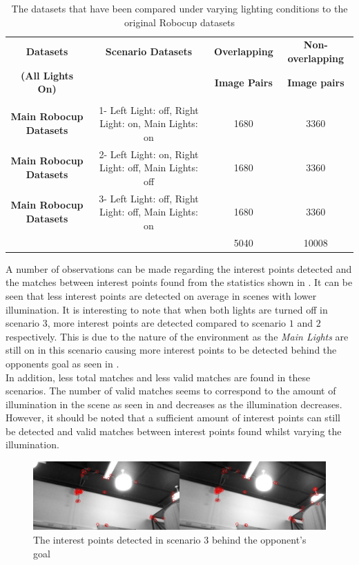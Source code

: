 \documentclass[11pt]{report}
\begin{document}
\begin{table}
\centering
\caption{The datasets that have been compared under varying lighting conditions
to the original Robocup datasets}
\footnotesize
\begin{tabular}{|c|c|c|c|}
\hline 
\textbf{Datasets} & \textbf{Scenario Datasets} & \textbf{Overlapping } & \textbf{Non-overlapping }\tabularnewline
\textbf{(All Lights On)} &  & \textbf{Image Pairs} & \textbf{Image pairs}\tabularnewline
\hline 
\hline 
 &  &  & \tabularnewline
\hline 
\textbf{Main Robocup Datasets} & 1- Left Light: off, Right Light: on, Main Lights: on & 1680 & 3360\tabularnewline
\hline 
\textbf{Main Robocup Datasets} & 2- Left Light: on, Right Light: off, Main Lights: off & 1680 & 3360\tabularnewline
\hline 
\textbf{Main Robocup Datasets} & 3- Left Light: off, Right Light: off, Main Lights: on & 1680 & 3360\tabularnewline
\hline 
 &  & 5040 & 10008\tabularnewline
\hline 
\end{tabular}
\label{tab:datasetLighting}
\end{table}

A number of observations can be made regarding the interest points detected and the matches between interest points found from the statistics shown in . It can be seen that less interest points are detected on average in scenes with lower illumination. It is interesting to note that when both lights are turned off in scenario $3$, more interest points are detected compared to scenario $1$ and $2$ respectively. This is due to the nature of the environment as the \textit{Main Lights} are still on in this scenario causing more interest points to be detected behind the opponents goal as seen in . \\

In addition, less total matches and less valid matches are found in these scenarios. The number of valid matches seems to correspond to the amount of illumination in the scene as seen in  and decreases as the illumination decreases. However, it should be noted that a sufficient amount of interest points can still be detected and valid matches between interest points found whilst varying the illumination.\\

\begin{figure}[h!] 
  \centering
    \includegraphics[width=1.0\textwidth]{../Drawings/Matching/dataset_lighting_incorrect_matches_OG.jpg}
    \caption{The interest points detected in scenario $3$ behind the opponent's goal}
    \label{fig:lighting_og}
\end{figure}
\end{document}
